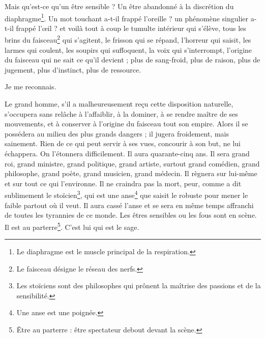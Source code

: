	{

\vspace*{-18pt}

Mais qu’est-ce qu’un être sensible ? Un être abandonné à la discrétion du diaphragme\footnote{Le diaphragme est le muscle principal de la respiration.}. Un mot touchant a-t-il frappé l’oreille ? un phénomène singulier a-t-il frappé l’œil ? et voilà tout à coup le tumulte intérieur qui s’élève, tous les brins du faisceau\footnote{Le faisceau désigne le réseau des nerfs.} qui s’agitent, le frisson qui se répand, l’horreur qui saisit, les larmes qui coulent, les soupirs qui suffoquent, la voix qui s’interrompt, l’origine du faisceau qui ne sait ce qu’il devient ; plus de sang-froid, plus de raison, plus de jugement, plus d’instinct, plus de ressource.


Je me reconnais.


Le grand homme, s’il a malheureusement reçu cette disposition naturelle, s’occupera sans relâche à l’affaiblir, à la dominer, à se rendre maître de ses mouvements, et à conserver à l’origine du faisceau tout son empire. Alors il se possédera au milieu des plus grands dangers ; il jugera froidement, mais sainement. Rien de ce qui peut servir à ses vues, concourir à son but, ne lui échappera. On l’étonnera difficilement. Il aura quarante-cinq ans. Il sera grand roi, grand ministre, grand politique, grand artiste, surtout grand comédien, grand philosophe, grand poète, grand musicien, grand médecin. Il règnera sur lui-même et sur tout ce qui l’environne. Il ne craindra pas la mort, peur, comme a dit sublimement le stoïcien\footnote{Les stoïciens sont des philosophes qui prônent la maîtrise des passions et de la sensibilité.}, qui est une anse\footnote{Une anse est une poignée.} que saisit le robuste pour mener le faible partout où il veut. Il aura cassé l’anse et se sera en même temps affranchi de toutes les tyrannies de ce monde. Les êtres sensibles ou les fous sont en scène. Il est au parterre\footnote{Être au parterre : être spectateur debout devant la scène.}. C’est lui qui est le sage.

}

